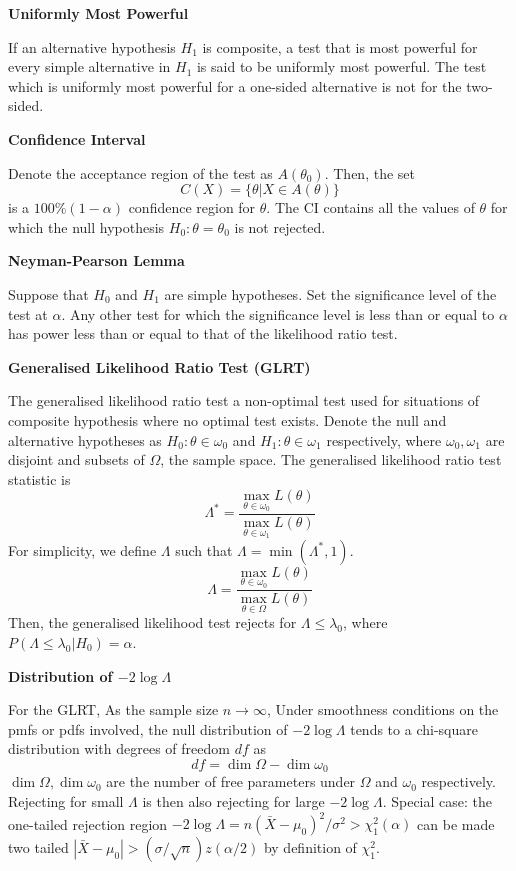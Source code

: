 \documentclass[a4paper]{article}
\newcommand{\subheading}[1]{{\scriptsize\textbf{#1}}}
\renewenvironment{section}[1]
  {
    \subheading{#1}

  }{
    \smallskip
  }
\begin{document}
\begin{multicols*}{4}
\begin{section}{Uniformly Most Powerful}
  If an alternative hypothesis $H_1$ is composite, a test that is most powerful
  for every simple alternative in $H_1$ is said to be uniformly most powerful.
  The test which is uniformly most powerful for a one-sided alternative is not
  for the two-sided.
\end{section}

\begin{section}{Confidence Interval}
  Denote the acceptance region of the test as $A(\theta_0)$. Then, the set
  $$C(X) = \{\theta | X \in A(\theta) \}$$
  is a $100\%(1-\alpha)$ confidence region for $\theta$. The CI contains all the
  values of $\theta$ for which the null hypothesis $H_0: \theta = \theta_0$ is
  not rejected.
\end{section}

\begin{section}{Neyman-Pearson Lemma}
  Suppose that $H_0$ and $H_1$ are simple hypotheses. Set the significance level
  of the test at $\alpha$. Any other test for which the significance level is
  less than or equal to $\alpha$ has power less than or equal to that of the
  likelihood ratio test.
\end{section}

\begin{section}{Generalised Likelihood Ratio Test (GLRT)}
  The generalised likelihood ratio test a non-optimal test used for situations
  of composite hypothesis where no optimal test exists. Denote the null and
  alternative hypotheses as $H_0: \theta \in \omega_0$ and $H_1: \theta \in
  \omega_1$ respectively, where $\omega_0, \omega_1$ are disjoint and subsets of
  $\Omega$, the sample space. The generalised likelihood ratio test statistic is
  $$\Lambda^* = \frac{
    \max_{\theta \in \omega_0} L(\theta)
  }{
    \max_{\theta \in \omega_1} L(\theta)
  }$$
  For simplicity, we define $\Lambda$ such that $\Lambda = \min(\Lambda^*, 1)$.
  $$\Lambda = \frac{
    \max_{\theta \in \omega_0} L(\theta)
  }{
    \max_{\theta \in \Omega} L(\theta)
  }$$
  Then, the generalised likelihood test rejects for $\Lambda \leq \lambda_0$,
  where $P(\Lambda \leq \lambda_0 | H_0) = \alpha$.
\end{section}

\begin{section}{Distribution of $-2\log\Lambda$}
  For the GLRT, As the sample size $n \rightarrow \infty$, Under smoothness
  conditions on the pmfs or pdfs involved, the null distribution of $-2\log
  \Lambda$ tends to a chi-square distribution with degrees of freedom $df$ as
  $$df = \dim \Omega - \dim \omega_0$$
  $\dim \Omega, \dim \omega_0$ are the number of free parameters under $\Omega$
  and $\omega_0$ respectively. Rejecting for small $\Lambda$ is then also
  rejecting for large $-2\log\Lambda$. Special case: the one-tailed rejection
  region $-2\log\Lambda = n(\bar{X}-\mu_0)^2/\sigma^2 > \chi^2_1(\alpha)$ can be
  made two tailed $|\bar{X}-\mu_0| > (\sigma/\sqrt{n})z(\alpha/2)$ by definition
  of $\chi^2_1$.
\end{section}


\end{multicols*}
\end{document}
